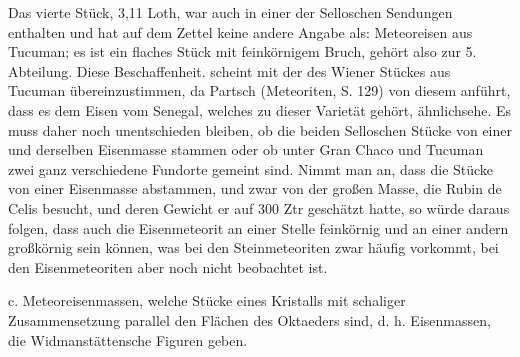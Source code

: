 \documentclass[a4paper, 11pt, oneside]{article}
\begin{document}
Das vierte Stück, 3,11 Loth, war auch in einer der Selloschen Sendungen enthalten und hat auf dem Zettel keine andere Angabe als: Meteoreisen aus Tucuman; es ist ein flaches Stück mit feinkörnigem Bruch, gehört also zur 5. Abteilung. Diese Beschaffenheit. scheint mit der des Wiener Stückes aus Tucuman übereinzustimmen, da Partsch (Meteoriten, S. 129) von diesem anführt, dass es dem Eisen vom Senegal, welches zu dieser Varietät gehört, ähnlichsehe. Es muss daher noch unentschieden bleiben, ob die beiden Selloschen Stücke von einer und derselben Eisenmasse stammen oder ob unter Gran Chaco und Tucuman zwei ganz verschiedene Fundorte gemeint sind. Nimmt man an, dass die Stücke von einer Eisenmasse abstammen, und zwar von der großen Masse, die Rubin de Celis besucht, und deren Gewicht er auf 300 Ztr geschätzt hatte, so würde daraus folgen, dass auch die Eisenmeteorit an einer Stelle feinkörnig und an einer andern großkörnig sein können, was bei den Steinmeteoriten zwar häufig vorkommt, bei den Eisenmeteoriten aber noch nicht beobachtet ist.

c. Meteoreisenmassen, welche Stücke eines Kristalls mit schaliger Zusammensetzung parallel den Flächen des Oktaeders sind, d. h. Eisenmassen, die Widmanstättensche Figuren geben.
\end{document}
